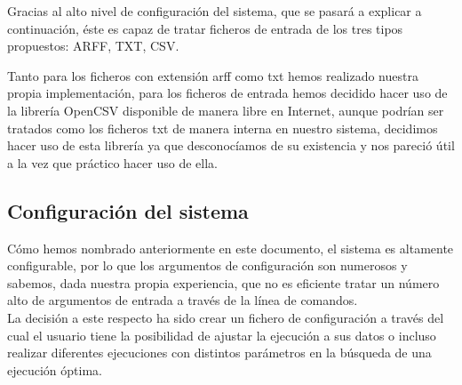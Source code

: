 \documentclass[10pt,a4paper]{article}
\begin{document}
Gracias al alto nivel de configuración del sistema, que se pasará a explicar a continuación, éste es capaz de tratar ficheros de entrada de los tres tipos propuestos: ARFF, TXT, CSV.

Tanto para los ficheros con extensión arff como txt hemos realizado nuestra propia implementación, para los ficheros de entrada hemos decidido hacer uso de la librería OpenCSV disponible de manera libre en Internet, aunque podrían ser tratados como los ficheros txt de manera  interna en nuestro sistema, decidimos hacer uso de esta librería ya que desconocíamos de su existencia y nos pareció útil a la vez que práctico hacer uso de ella.

\subsection{Configuración del sistema}

Cómo hemos nombrado anteriormente en este documento, el sistema es altamente configurable, por lo que los argumentos de configuración son numerosos y sabemos, dada nuestra propia experiencia, que no es eficiente tratar un número alto de argumentos de entrada a través de la línea de comandos.\\

La decisión a este respecto ha sido crear un fichero de configuración a través del cual el usuario tiene la posibilidad de ajustar la ejecución a sus datos o incluso realizar diferentes ejecuciones con distintos parámetros en la búsqueda de una ejecución óptima.\\
\end{document}
